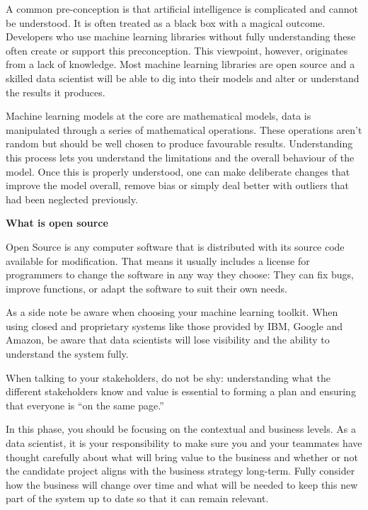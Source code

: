 \documentclass[
]{book}
\begin{document}
A common pre-conception is that artificial intelligence is complicated and cannot be understood. It is often treated as a black box with a magical outcome. Developers who use machine learning libraries without fully understanding these often create or support this preconception. This viewpoint, however, originates from a lack of knowledge. Most machine learning libraries are open source and a skilled data scientist will be able to dig into their models and alter or understand the results it produces.

Machine learning models at the core are mathematical models, data is manipulated through a series of mathematical operations. These operations aren't random but should be well chosen to produce favourable results. Understanding this process lets you understand the limitations and the overall behaviour of the model. Once this is properly understood, one can make deliberate changes that improve the model overall, remove bias or simply deal better with outliers that had been neglected previously.

\begin{infobox}

\textbf{What is open source}

Open Source is any computer software that is distributed with its source code available for modification. That means it usually includes a license for programmers to change the software in any way they choose: They can fix bugs, improve functions, or adapt the software to suit their own needs.

\end{infobox}

As a side note be aware when choosing your machine learning toolkit. When using closed and proprietary systems like those provided by IBM, Google and Amazon, be aware that data scientists will lose visibility and the ability to understand the system fully.

When talking to your stakeholders, do not be shy: understanding what the different stakeholders know and value is essential to forming a plan and ensuring that everyone is ``on the same page.''

In this phase, you should be focusing on the contextual and business levels. As a data scientist, it is your responsibility to make sure you and your teammates have thought carefully about what will bring value to the business and whether or not the candidate project aligns with the business strategy long-term. Fully consider how the business will change over time and what will be needed to keep this new part of the system up to date so that it can remain relevant.
\end{document}
